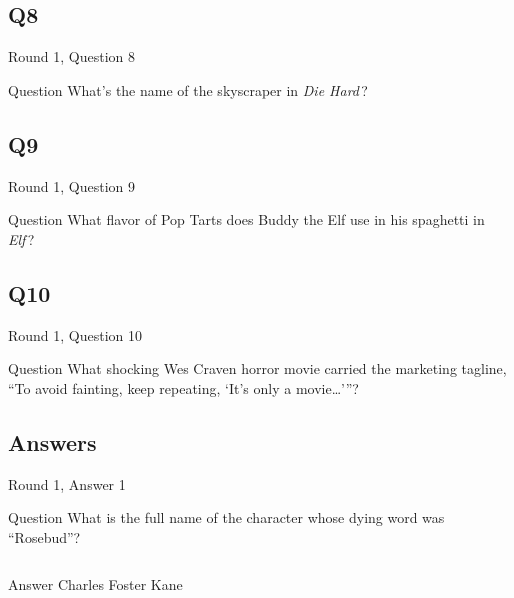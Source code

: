 \documentclass[11pt]{beamer}
\begin{document}
\subsection*{Q8}
\begin{frame}[t]{Round 1, Question 8}
\vspace{2em}
\begin{block}{Question}
What's the name of the skyscraper in \emph{Die Hard}\,?
\end{block}
\end{frame}
    

\subsection*{Q9}
\begin{frame}[t]{Round 1, Question 9}
\vspace{2em}
\begin{block}{Question}
What flavor of Pop Tarts does Buddy the Elf use in his spaghetti in \emph{Elf}\,?
\end{block}
\end{frame}
    

\subsection*{Q10}
\begin{frame}[t]{Round 1, Question 10}
\vspace{2em}
\begin{block}{Question}
What shocking Wes Craven horror movie carried the marketing tagline, ``To avoid fainting, keep repeating, `It's only a movie…'{}''?
\end{block}
\end{frame}
    
\subsection{Answers}

\begin{frame}[t]{Round 1, Answer 1}
\vspace{2em}
\begin{block}{Question}
What is the full name of the character whose dying word was ``Rosebud''?
\end{block}
\pause{}
\begin{columns}[T,totalwidth=\linewidth]
\begin{column}{0.35\linewidth}
\begin{block}{Answer}
Charles Foster Kane
\end{block}
\end{column}
\begin{column}{0.6\linewidth}
\begin{center}
\texttt{[image: \{Images/citizenkane]}.jpg}
\end{center}
\end{column}
\end{columns}
\end{frame}
    
\end{document}
